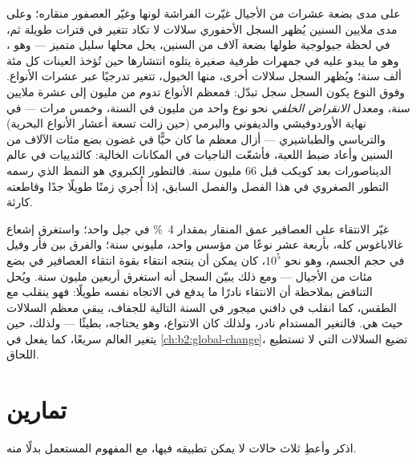 \begin{proposition}\label{prop:b2:speciation:tempo}
على مدى بضعة عشرات من الأجيال غيّرت الفراشة لونها وغيّر العصفور
منقاره؛ وعلى مدى ملايين السنين يُظهر السجل الأحفوري سلالات
لا تكاد تتغير في فترات طويلة ثم، في
لحظة جيولوجية طولها بضعة آلاف من السنين، يحل محلها سليل
متميز --- وهو \emph{}، وهو ما يبدو عليه
 في جمهرات طرفية صغيرة يتلوه
انتشارها حين تُؤخذ العينات كل مئة ألف سنة؛
ويُظهر السجل سلالات أخرى، منها الخيول، تتغير
تدرجيًا عبر عشرات الأنواع. وفوق النوع يكون السجل
سجل تبدّل: فمعظم الأنواع تدوم من مليون إلى عشرة ملايين سنة،
ومعدل \emph{الانقراض الخلفي} نحو نوع واحد من
مليون في السنة، وخمس مرات --- في نهاية الأوردوفيشي
والديفوني والبرمي (حين زالت تسعة أعشار الأنواع البحرية)
والترياسي والطباشيري --- أزال \emph{} معظم
ما كان حيًّا في غضون بضع مئات الآلاف من السنين وأعاد ضبط اللعبة،
فأشعّت الناجيات في المكانات الخالية: كالثدييات في
عالم الديناصورات بعد كويكب قبل 66 مليون سنة.
فالتطور الكبروي هو النمط الذي رسمه التطور الصغروي في هذا
الفصل والفصل السابق، إذا أُجري زمنًا طويلًا جدًا وقاطعته
كارثة.
\end{proposition}

\begin{example}\label{ex:b2:speciation:rates}
غيّر الانتقاء على العصافير عمق المنقار بمقدار \qty{4}{\%} في جيل
واحد؛ واستغرق إشعاع غالاباغوس كله، بأربعة عشر نوعًا من
مؤسس واحد، مليوني سنة؛ والفرق بين فأر
وفيل في حجم الجسم، وهو نحو $10^{5}$، كان يمكن أن ينتجه
انتقاء بقوة انتقاء العصافير في بضع مئات من الأجيال ---
ومع ذلك يبيّن السجل أنه استغرق أربعين مليون سنة. ويُحل التناقض
بملاحظة أن الانتقاء نادرًا ما يدفع في الاتجاه نفسه
طويلًا: فهو ينقلب مع الطقس، كما انقلب في دافني ميجور في
السنة التالية للجفاف،  يبقي معظم
السلالات حيث هي. فالتغير المستدام نادر، ولذلك كان
الانتواع، وهو يحتاجه، بطيئًا --- ولذلك، حين يتغير العالم
سريعًا، كما يفعل في \cref{ch:b2:global-change}، تضيع
السلالات التي لا تستطيع اللحاق.
\end{example}

\section{تمارين}

\begin{exercise}[$\star$]\label{exo:b2:speciation:1}
اذكر  وأعطِ ثلاث حالات لا
يمكن تطبيقه فيها، مع المفهوم المستعمل بدلًا منه.
\end{exercise}

